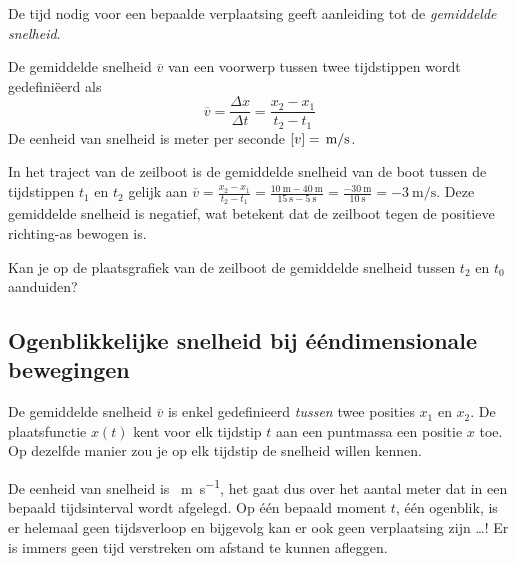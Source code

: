 \documentclass{ximera}
\begin{document}

De tijd nodig voor een bepaalde verplaatsing geeft aanleiding tot de \textit{gemiddelde snelheid}. 


\begin{definition}
	
De gemiddelde snelheid $\overline{v}$ van een voorwerp tussen twee tijdstippen wordt gedefiniëerd als
\[
\overline{v}=\frac{\Delta x}{\Delta t}=\frac{x_2-x_1}{t_2-t_1}
\]
De eenheid van snelheid is meter per seconde $[v]=\rm\,m/s$. 
\end{definition}


In het traject van de zeilboot is de gemiddelde snelheid van de boot tussen de tijdstippen $t_1$ en $t_2$ gelijk aan 
$\overline{v}=\frac{x_2-x_1}{t_2-t_1}=\frac{\SI{10}{\meter} - \SI{40}{\meter}}{\SI{15}{\second} - \SI{5}{\second}}= \frac{\SI{-30}{\meter}}{\SI{10}{\second}} = \SI{-3}{\meter\per\second}$. 
Deze gemiddelde snelheid is negatief, wat betekent dat de zeilboot tegen de positieve richting-as bewogen is. 


\begin{quickquestion*}
Kan je op de plaatsgrafiek van de zeilboot de gemiddelde snelheid tussen \(t_2\) en \(t_0\) aanduiden? 
\end{quickquestion*}



\subsection*{Ogenblikkelijke snelheid bij ééndimensionale bewegingen}

De gemiddelde snelheid \(\overline{v}\) is enkel gedefinieerd \textit{tussen} twee posities \(x_1\) en \(x_2\). 
De plaatsfunctie \(x(t)\) kent voor elk tijdstip \(t\) aan een puntmassa een positie \(x\) toe. Op dezelfde manier zou je op elk tijdstip de snelheid willen kennen. 

De eenheid van snelheid is \SI{}{\meter\per\second}, het gaat dus over het aantal meter dat in een bepaald tijds\-in\-ter\-val wordt afgelegd. 
Op één bepaald moment \(t\), één ogenblik, is er helemaal geen tijdsverloop en bijgevolg kan er ook geen verplaatsing zijn \ldots! Er is immers geen tijd verstreken om afstand te kunnen afleggen.
\end{document}
